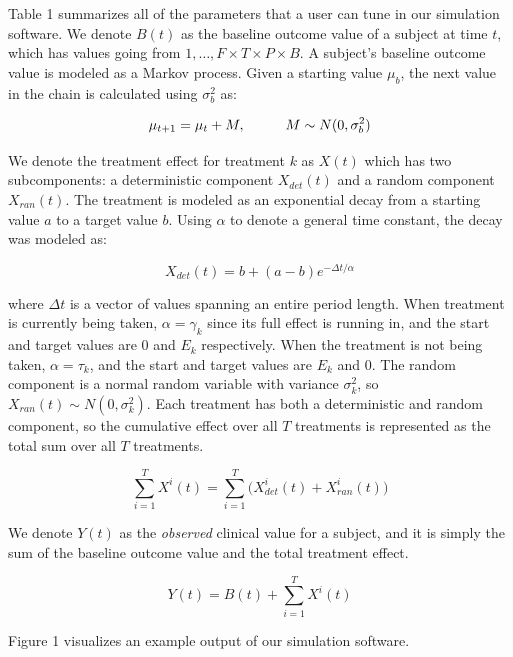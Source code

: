 \documentclass[11pt,]{article}
\begin{document}
Table 1 summarizes all of the parameters that a user can tune in our
simulation software. We denote \(B(t)\) as the baseline outcome value of
a subject at time \(t\), which has values going from
\(1, \ldots, F \times T \times P \times B\). A subject's baseline
outcome value is modeled as a Markov process. Given a starting value
\(\mu_b\), the next value in the chain is calculated using
\(\sigma^2_b\) as:

\[
\mu_{t+1} = \mu_t + M, \hspace{10mm} M \sim N(0, \sigma^2_b)
\]

We denote the treatment effect for treatment \(k\) as \(X(t)\) which has
two subcomponents: a deterministic component \(X_{det}(t)\) and a random
component \(X_{ran}(t)\). The treatment is modeled as an exponential
decay from a starting value \(a\) to a target value \(b\). Using
\(\alpha\) to denote a general time constant, the decay was modeled as:

\[
X_{det}(t) = b + (a - b)e^{-\Delta t/\alpha}
\]

where \(\Delta t\) is a vector of values spanning an entire period
length. When treatment is currently being taken, \(\alpha = \gamma_k\)
since its full effect is running in, and the start and target values are
0 and \(E_k\) respectively. When the treatment is not being taken,
\(\alpha = \tau_k\), and the start and target values are \(E_k\) and 0.
The random component is a normal random variable with variance
\(\sigma^2_k\), so \(X_{ran}(t) \sim N(0, \sigma^2_k)\). Each treatment
has both a deterministic and random component, so the cumulative effect
over all \(T\) treatments is represented as the total sum over all \(T\)
treatments.

\[
\sum^T_{i=1} X^i(t) = \sum^T_{i=1} \bigg( X_{det}^i (t) + X_{ran}^i (t)\bigg)
\]

We denote \(Y(t)\) as the \emph{observed} clinical value for a subject,
and it is simply the sum of the baseline outcome value and the total
treatment effect.

\[
Y(t) = B(t) + \sum^T_{i=1} X^i(t)
\]

Figure 1 visualizes an example output of our simulation software.
\end{document}
